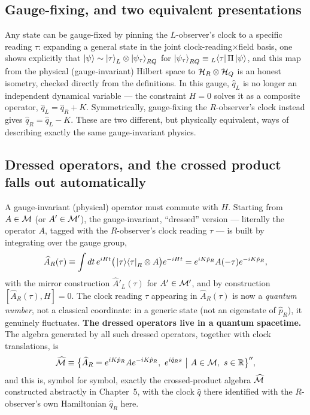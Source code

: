 \subsection*{Gauge-fixing, and two equivalent presentations}

Any state can be gauge-fixed by pinning the $L$-observer's clock to a specific reading $\tau$: expanding a
general state in the joint clock-reading$\times$field basis, one shows explicitly that $\ket\psi\sim
\ket\tau_L\otimes\ket{\psi_\tau}_{RQ}$ for $\ket{\psi_\tau}_{RQ}\equiv{}_L\!\bra\tau\Pi\ket\psi$, and this map
from the physical (gauge-invariant) Hilbert space to $\mathcal{H}_R\otimes\mathcal{H}_Q$ is an honest isometry, checked
directly from the definitions. In this gauge, $\hat q_L$ is no longer an independent dynamical variable — the
constraint $H=0$ solves it as a composite operator, $\hat q_L=\hat q_R+K$. Symmetrically, gauge-fixing the
$R$-observer's clock instead gives $\hat q_R=\hat q_L-K$. These are two different, but physically equivalent,
ways of describing exactly the same gauge-invariant physics.

\subsection*{Dressed operators, and the crossed product falls out automatically}

A gauge-invariant (physical) operator must commute with $H$. Starting from $A\in\mathcal{M}$ (or $A'\in\mathcal{M}'$), the
gauge-invariant, ``dressed'' version — literally the operator $A$, tagged with the $R$-observer's clock
reading $\tau$ — is built by integrating over the gauge group,
\[
\widehat A_R(\tau) \equiv \int dt\,e^{iHt}\big(\ket\tau\!\bra\tau_R\otimes A\big)e^{-iHt}
= e^{iK\hat p_R}A(-\tau)e^{-iK\hat p_R} ,
\]
with the mirror construction $\widehat A'_L(\tau)$ for $A'\in\mathcal{M}'$, and by construction
$[\widehat A_R(\tau),H]=0$. The clock reading $\tau$ appearing in $\widehat A_R(\tau)$ is now a \emph{quantum
number}, not a classical coordinate: in a generic state (not an eigenstate of $\hat p_R$), it genuinely
fluctuates. \textbf{The dressed operators live in a quantum spacetime.} The algebra generated by all such
dressed operators, together with clock translations, is
\[
\widehat{\mathcal{M}} \equiv \big\{\widehat A_R = e^{iK\hat p_R}Ae^{-iK\hat p_R},\ e^{i\hat q_Rs}\ \big|\ A\in\mathcal{M},\
s\in\mathbb R\big\}'' ,
\]
and this is, symbol for symbol, exactly the crossed-product algebra $\widehat{\mathcal{M}}$ constructed abstractly in
Chapter~5, with the clock $\hat q$ there identified with the $R$-observer's own Hamiltonian $\hat q_R$ here.


